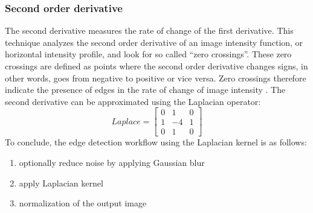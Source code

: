 \subsubsection*{Second order derivative}
The second derivative measures the rate of change of the first derivative.
This technique analyzes the second order derivative of an image intensity function, or horizontal intensity profile,
and look for so called ``zero crossings''.
These zero crossings are defined as points where the second order derivative changes signs,
in other words, goes from negative to positive or vice versa.
Zero crossings therefore indicate the presence of edges in the rate of change of image intensity \cite{gonzalezDigitalImageProcessing2007}.
The second derivative can be approximated using the Laplacian operator:
\begin{equation}
	Laplace =
	\begin{bmatrix}
		0 & 1  & 0 \\
		1 & -4 & 1 \\
		0 & 1  & 0
	\end{bmatrix}
\end{equation}
To conclude, the edge detection workflow using the Laplacian kernel is as follows:
\begin{enumerate}
	\item optionally reduce noise by applying Gaussian blur
	\item apply Laplacian kernel
	\item normalization of the output image
\end{enumerate}

